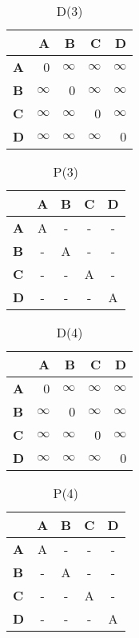 \documentclass{article}
\newcommand{\INF}{$\infty$}
\begin{document}
\begin{table}[H]\centering
\caption{D(3)}
\begin{tabular}{l r r r r}
\toprule
 & \textbf{A} & \textbf{B} & \textbf{C} & \textbf{D}\\\midrule
\textbf{A} & 0 & \INF & \INF & \INF \\
\textbf{B} & \INF & 0 & \INF & \INF \\
\textbf{C} & \INF & \INF & 0 & \INF \\
\textbf{D} & \INF & \INF & \INF & 0 \\
\bottomrule
\end{tabular}
\end{table}

\begin{table}[H]\centering
\caption{P(3)}
\begin{tabular}{l c c c c}
\toprule
 & \textbf{A} & \textbf{B} & \textbf{C} & \textbf{D}\\\midrule
\textbf{A} & A & - & - & - \\
\textbf{B} & - & A & - & - \\
\textbf{C} & - & - & A & - \\
\textbf{D} & - & - & - & A \\
\bottomrule
\end{tabular}
\end{table}

\begin{table}[H]\centering
\caption{D(4)}
\begin{tabular}{l r r r r}
\toprule
 & \textbf{A} & \textbf{B} & \textbf{C} & \textbf{D}\\\midrule
\textbf{A} & 0 & \INF & \INF & \INF \\
\textbf{B} & \INF & 0 & \INF & \INF \\
\textbf{C} & \INF & \INF & 0 & \INF \\
\textbf{D} & \INF & \INF & \INF & 0 \\
\bottomrule
\end{tabular}
\end{table}

\begin{table}[H]\centering
\caption{P(4)}
\begin{tabular}{l c c c c}
\toprule
 & \textbf{A} & \textbf{B} & \textbf{C} & \textbf{D}\\\midrule
\textbf{A} & A & - & - & - \\
\textbf{B} & - & A & - & - \\
\textbf{C} & - & - & A & - \\
\textbf{D} & - & - & - & A \\
\bottomrule
\end{tabular}
\end{table}
\end{document}
